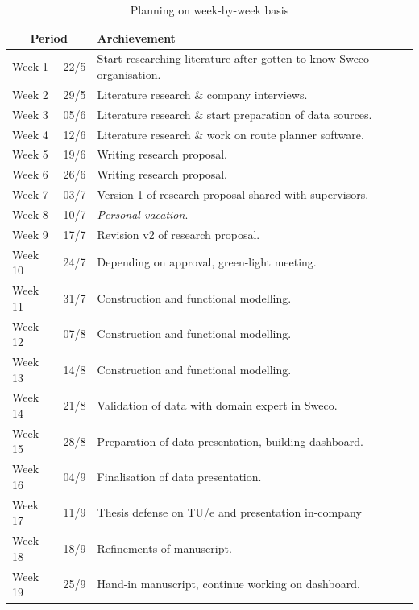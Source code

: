 \documentclass[sigconf, natbib=false, nonacm]{acmart}
\begin{document}
    \begin{table}
        \centering
        \begin{tabular}{ p{1.1cm} p{0.8cm} p{5.5cm} }
            \multicolumn{2}{c}{Period} & Archievement \\
            \hline
            Week 1  & 22/5 & Start researching literature after gotten to know Sweco organisation. \\
            Week 2  & 29/5 & Literature research \& company interviews. \\
            Week 3  & 05/6 & Literature research \& start preparation of data sources. \\
            Week 4  & 12/6 & Literature research \& work on route planner software. \\
            Week 5  & 19/6 & Writing research proposal. \\
            Week 6  & 26/6 & Writing research proposal. \\
            Week 7  & 03/7 & Version 1 of research proposal shared with supervisors. \\
            Week 8  & 10/7 & \textit{Personal vacation}. \\
            Week 9  & 17/7 & Revision v2 of research proposal. \\
            Week 10 & 24/7 & Depending on approval, green-light meeting. \\
            Week 11 & 31/7 & Construction and functional modelling. \\
            Week 12 & 07/8 & Construction and functional modelling. \\
            Week 13 & 14/8 & Construction and functional modelling. \\
            Week 14 & 21/8 & Validation of data with domain expert in Sweco. \\
            Week 15 & 28/8 & Preparation of data presentation, building dashboard. \\
            Week 16 & 04/9 & Finalisation of data presentation. \\
            Week 17 & 11/9 & Thesis defense on TU/e and presentation in-company \\
            Week 18 & 18/9 & Refinements of manuscript. \\
            Week 19 & 25/9 & Hand-in manuscript, continue working on dashboard. \\
        \end{tabular}
        \caption{Planning on week-by-week basis}
        \label{tab:planning}
    \end{table}
\end{document}
